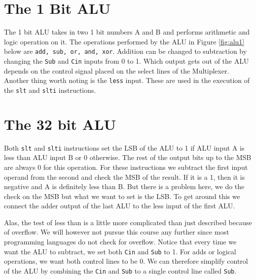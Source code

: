 \documentclass[12pt]{report}
\begin{document}
\section{The 1 Bit ALU}
The 1 bit ALU takes in two 1 bit numbers A and B and performs arithmetic and logic operation on it. The operations performed by the ALU in Figure \ref{fig:alu1} below are \texttt{add, sub, or, and, xor}. Addition can be changed to subtraction by changing the \texttt{Sub} and \texttt{Cin} inputs from 0 to 1. Which output gets out of the ALU depends on the control signal placed on the select lines of the Multiplexer. Another thing worth noting is the \texttt{less} input. These are used in the execution of the \texttt{slt} and \texttt{slti} instructions. 

\section{The 32 bit ALU}
Both \texttt{slt} and \texttt{slti} instructions set the LSB of the ALU to 1 if ALU input A is less than ALU input B or 0 otherwise. The rest of the output bits up to the MSB are always 0 for this operation. For these instructions we subtract the first input operand from the second and check the MSB of the result. If it is  a 1, then it is negative and A is definitely less than B. But there is a problem here, we do the check on the MSB but what we want to set is the LSB. To get around this we connect the adder output of the last ALU to the less input of the first ALU.

Alas, the test of less than is a little more complicated than just described because of overflow. We will however not pursue this course any further since most programming languages do not check for overflow.
Notice that every time we want the ALU to subtract, we set both \texttt{Cin} and
 \texttt{Sub} to 1. For adds or logical operations, we want both control lines to be 0. We can therefore simplify control of the ALU by combining the \texttt{Cin} and  \texttt{Sub} to a single control line called \texttt{Sub}.
 
\end{document}
